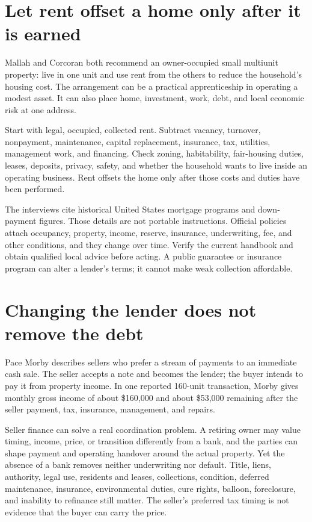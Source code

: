 \section{Let rent offset a home only after it is earned}

Mallah and Corcoran both recommend an owner-occupied small multiunit property:
live in one unit and use rent from the others to reduce the household's housing
cost. The arrangement can be a practical apprenticeship in operating a modest
asset. It can also place home, investment, work, debt, and local economic risk
at one address.

Start with legal, occupied, collected rent. Subtract vacancy, turnover,
nonpayment, maintenance, capital replacement, insurance, tax, utilities,
management work, and financing. Check zoning, habitability, fair-housing
duties, leases, deposits, privacy, safety, and whether the household wants to
live inside an operating business. Rent offsets the home only after those costs
and duties have been performed.

The interviews cite historical United States mortgage programs and down-payment
figures. Those details are not portable instructions. Official policies attach
occupancy, property, income, reserve, insurance, underwriting, fee, and other
conditions, and they change over time. Verify the current handbook and obtain
qualified local advice before acting. A public guarantee or insurance program
can alter a lender's terms; it cannot make weak collection affordable.

\section{Changing the lender does not remove the debt}

Pace Morby describes sellers who prefer a stream of payments to an immediate
cash sale. The seller accepts a note and becomes the lender; the buyer intends
to pay it from property income. In one reported 160-unit transaction, Morby
gives monthly gross income of about \$160,000 and about \$53,000 remaining after
the seller payment, tax, insurance, management, and repairs.

Seller finance can solve a real coordination problem. A retiring owner may
value timing, income, price, or transition differently from a bank, and the
parties can shape payment and operating handover around the actual property.
Yet the absence of a bank removes neither underwriting nor default. Title,
liens, authority, legal use, residents and leases, collections, condition,
deferred maintenance, insurance, environmental duties, cure rights, balloon,
foreclosure, and inability to refinance still matter. The seller's preferred
tax timing is not evidence that the buyer can carry the price.

